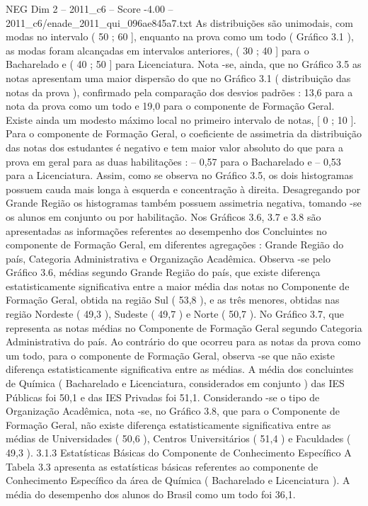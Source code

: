 \begin{textsample}{NEG Dim 2 – 2011\_c6 – Score -4.00 – 2011\_c6/enade\_2011\_qui\_096ae845a7.txt}
As distribuições são unimodais, com modas no intervalo ( 50 ; 60 ], enquanto na prova como um todo ( Gráfico 3.1 ), as modas foram alcançadas em intervalos anteriores, ( 30 ; 40 ] para o Bacharelado e ( 40 ; 50 ] para Licenciatura.
Nota -se, ainda, que no Gráfico 3.5 as notas apresentam uma maior dispersão do que no Gráfico 3.1 ( distribuição das notas da prova ), confirmado pela comparação dos desvios padrões : 13,6 para a nota da prova como um todo e 19,0 para o componente de Formação Geral.
Existe ainda um modesto máximo local no primeiro intervalo de notas, [ 0 ; 10 ].
Para o componente de Formação Geral, o coeficiente de assimetria da distribuição das notas dos estudantes é negativo e tem maior valor absoluto do que para a prova em geral para as duas habilitações : – 0,57 para o Bacharelado e – 0,53 para a Licenciatura.
Assim, como se observa no Gráfico 3.5, os dois histogramas possuem cauda mais longa à esquerda e concentração à direita.
Desagregando por Grande Região os histogramas também possuem assimetria negativa, tomando -se os alunos em conjunto ou por habilitação.
Nos Gráficos 3.6, 3.7 e 3.8 são apresentadas as informações referentes ao desempenho dos Concluintes no componente de Formação Geral, em diferentes agregações : Grande Região do país, Categoria Administrativa e Organização Acadêmica.
Observa -se pelo Gráfico 3.6, médias segundo Grande Região do país, que existe diferença estatisticamente significativa entre a maior média das notas no Componente de Formação Geral, obtida na região Sul ( 53,8 ), e as três menores, obtidas nas região Nordeste ( 49,3 ), Sudeste ( 49,7 ) e Norte ( 50,7 ).
No Gráfico 3.7, que representa as notas médias no Componente de Formação Geral segundo Categoria Administrativa do país.
Ao contrário do que ocorreu para as notas da prova como um todo, para o componente de Formação Geral, observa -se que não existe diferença estatisticamente significativa entre as médias.
A média dos concluintes de Química ( Bacharelado e Licenciatura, considerados em conjunto ) das IES Públicas foi 50,1 e das IES Privadas foi 51,1.
Considerando -se o tipo de Organização Acadêmica, nota -se, no Gráfico 3.8, que para o Componente de Formação Geral, não existe diferença estatisticamente significativa entre as médias de Universidades ( 50,6 ), Centros Universitários ( 51,4 ) e Faculdades ( 49,3 ). 3.1.3 Estatísticas Básicas do Componente de Conhecimento Específico A Tabela 3.3 apresenta as estatísticas básicas referentes ao componente de Conhecimento Específico da área de Química ( Bacharelado e Licenciatura ).
A média do desempenho dos alunos do Brasil como um todo foi 36,1.

\end{textsample}
